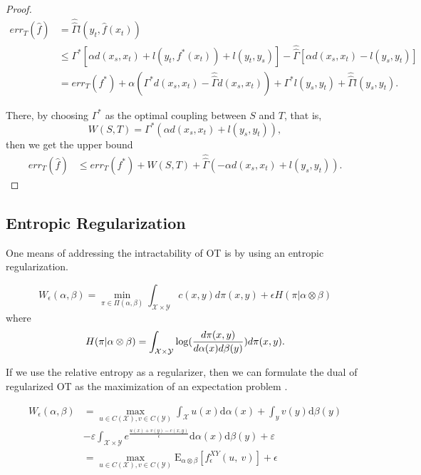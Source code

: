 \begin{proof}
	\begin{align*}
	err_{T}(\hat{f}) &= \hat{\hat{\Gamma}} l (y_t,\hat f(x_t)) \\
	& \leq \Gamma^{*}\left[\alpha
	d(x_{s},x_{t})+l(y_{t},f^{*}(x_{t}))+l(y_{t},y_{s})\right]
	- \hat{\hat{\Gamma}}\left[\alpha d(x_{s},x_{t})-l(y_{s},y_{t})\right] \\
	& = err_{T}(f^{*})+\alpha\left(\Gamma^{*}d(x_{s},x_{t})
	-\hat{\hat{\Gamma}}d(x_{s},x_{t})\right)
	+\Gamma^{*}l(y_{s},y_{t})+\hat{\hat{\Gamma}}l(y_{s},y_{t}).
	\end{align*}
	
	There, by choosing $\Gamma^*$ as the optimal coupling between $S$ and $T$, that is,
	\[
	W(S,T) = \Gamma^*\left(\alpha d(x_{s},x_{t}) +
	l(y_{s},y_{t})\right),
	\]
	then we get the upper bound
	\begin{align*}
	err_{T}(\hat{f})
	& \leq err_{T}(f^{*})+W(S,T)+\hat{\hat{\Gamma}}\left(-\alpha
	d(x_{s},x_{t})+l(y_{s},y_{t})\right).
	\end{align*}
\end{proof}

\subsection{Entropic Regularization}

One means of addressing the intractability of OT is by using an entropic regularization.

\begin{definition}
	$$W_{\epsilon}(\alpha,\beta) = \min_{\pi \in \Pi(\alpha,\beta)} \int_{\mathcal{X}\times \mathcal{Y}} c(x,y)d\pi(x,y) + \epsilon H(\pi | \alpha \otimes \beta)$$
	where $$H(\pi | \alpha \otimes \beta) = \int_{\mathcal{X}\times \mathcal{Y}} \log (\frac{d\pi(x,y)}{d\alpha(x)d\beta(y)})d\pi(x,y).$$
\end{definition}

If we use the relative entropy as a regularizer, then we can formulate the dual of regularized OT as the maximization of an expectation problem \cite{Genevay2018}.

\begin{align*}
W_{\epsilon}(\alpha,\beta) &=\max_{u\in C(\mathcal{X}),v\in C(\mathcal{Y})}\int_{\mathcal{X}} u(x)\mathrm{d}\alpha(x)+\int_{y}v(y)\mathrm{d}\beta(y) \\
&-\varepsilon \int_{\mathcal{X}\times \mathcal{Y}} e^{\frac{u(x)+v(y)-c(x,y)}{\epsilon}}\mathrm{d}\alpha(x)\mathrm{d}\beta(y) + \varepsilon\\
&= \max_{u\in C(\mathcal{X}),v\in C(\mathcal{Y})} \mathrm{E}_{\alpha \otimes \beta} [f_{\epsilon}^{XY}(u,\ v)]+\epsilon
\end{align*}


